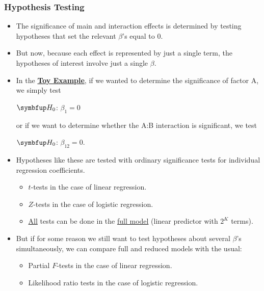 \subsubsection*{Hypothesis Testing}
\begin{itemize}
      \item The significance of main and interaction effects is determined by testing hypotheses that set the relevant
            $ \beta $'s equal to $ 0 $.
\end{itemize}
\begin{itemize}[*]
      \item But now, because each effect is represented by just a single term, the hypotheses of interest involve
            just a single $ \beta $.
\end{itemize}
\begin{itemize}
      \item In the \hyperref[ex:toy_ex]{\textbf{Toy Example}}, if we wanted to determine the significance of factor A, we simply test
            \begin{tightcenter}
                  $ \HN $: $ \beta_1=0 $
            \end{tightcenter}
            or if we want to determine whether the A:B interaction is significant, we test
            \begin{tightcenter}
                  $ \HN $: $ \beta_{12}=0 $.
            \end{tightcenter}
      \item Hypotheses like these are tested with ordinary significance tests for individual regression coefficients.
            \begin{itemize}
                  \item $ t $-tests in the case of linear regression.
                  \item $ Z $-tests in the case of logistic regression.
            \end{itemize}
            \begin{itemize}[*]
                  \item \underline{All} tests can be done in the \underline{full model} (linear predictor with $ 2^K $ terms).
            \end{itemize}
\end{itemize}
\begin{itemize}[$\rightarrow$]
      \item But if for some reason we still want to test hypotheses about several $ \beta $'s simultaneously, we can compare
            full and reduced models with the usual:
            \begin{itemize}
                  \item Partial $ F $-tests in the case of linear regression.
                  \item Likelihood ratio tests in the case of logistic regression.
            \end{itemize}
\end{itemize}
